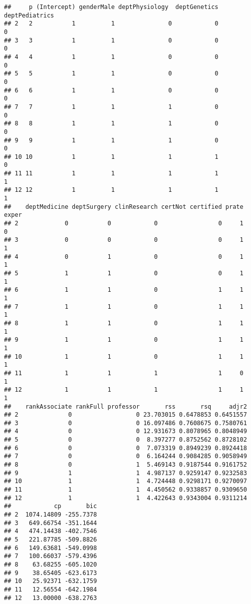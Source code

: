 \documentclass[]{article}
\begin{document}
\begin{verbatim}
##     p (Intercept) genderMale deptPhysiology  deptGenetics deptPediatrics
## 2   2           1          1               0            0              0
## 3   3           1          1               0            0              0
## 4   4           1          1               0            0              0
## 5   5           1          1               0            0              0
## 6   6           1          1               0            0              0
## 7   7           1          1               1            0              0
## 8   8           1          1               1            0              0
## 9   9           1          1               1            0              0
## 10 10           1          1               1            1              0
## 11 11           1          1               1            1              1
## 12 12           1          1               1            1              1
##    deptMedicine deptSurgery clinResearch certNot certified prate exper
## 2             0           0            0                 0     1     0
## 3             0           0            0                 0     1     1
## 4             0           1            0                 0     1     1
## 5             1           1            0                 0     1     1
## 6             1           1            0                 1     1     1
## 7             1           1            0                 1     1     1
## 8             1           1            0                 1     1     1
## 9             1           1            0                 1     1     1
## 10            1           1            0                 1     1     1
## 11            1           1            1                 1     0     1
## 12            1           1            1                 1     1     1
##    rankAssociate rankFull professor       rss       rsq     adjr2
## 2              0                  0 23.703015 0.6478853 0.6451557
## 3              0                  0 16.097486 0.7608675 0.7580761
## 4              0                  0 12.931673 0.8078965 0.8048949
## 5              0                  0  8.397277 0.8752562 0.8728102
## 6              0                  0  7.073319 0.8949239 0.8924418
## 7              0                  0  6.164244 0.9084285 0.9058949
## 8              0                  1  5.469143 0.9187544 0.9161752
## 9              1                  1  4.987137 0.9259147 0.9232583
## 10             1                  1  4.724448 0.9298171 0.9270097
## 11             1                  1  4.450562 0.9338857 0.9309650
## 12             1                  1  4.422643 0.9343004 0.9311214
##            cp       bic
## 2  1074.14809 -255.7378
## 3   649.66754 -351.1644
## 4   474.14438 -402.7546
## 5   221.87785 -509.8826
## 6   149.63681 -549.0998
## 7   100.66037 -579.4396
## 8    63.68255 -605.1020
## 9    38.65405 -623.6173
## 10   25.92371 -632.1759
## 11   12.56554 -642.1984
## 12   13.00000 -638.2763
\end{verbatim}
\end{document}
